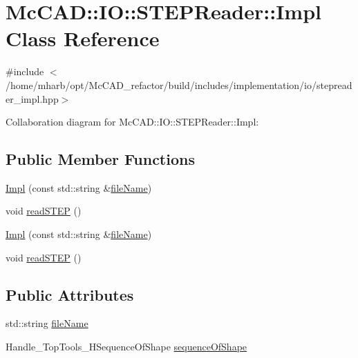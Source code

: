 \hypertarget{classMcCAD_1_1IO_1_1STEPReader_1_1Impl}{}\section{Mc\+C\+AD\+:\+:IO\+:\+:S\+T\+E\+P\+Reader\+:\+:Impl Class Reference}
\label{classMcCAD_1_1IO_1_1STEPReader_1_1Impl}


{\ttfamily \#include $<$/home/mharb/opt/\+Mc\+C\+A\+D\+\_\+refactor/build/includes/implementation/io/stepreader\+\_\+impl.\+hpp$>$}



Collaboration diagram for Mc\+C\+AD\+:\+:IO\+:\+:S\+T\+E\+P\+Reader\+:\+:Impl\+:
\subsection*{Public Member Functions}
\begin{DoxyCompactItemize}
\item 
\hyperlink{classMcCAD_1_1IO_1_1STEPReader_1_1Impl_a5be8cf4f0e40571ffdff4ecba69265ce}{Impl} (const std\+::string \&\hyperlink{classMcCAD_1_1IO_1_1STEPReader_1_1Impl_ad06c3157407f90e8a4b4524da0c9ceba}{file\+Name})
\item 
void \hyperlink{classMcCAD_1_1IO_1_1STEPReader_1_1Impl_adf3fe2fde0c4b949317c2e07b2fa57b9}{read\+S\+T\+EP} ()
\item 
\hyperlink{classMcCAD_1_1IO_1_1STEPReader_1_1Impl_a5be8cf4f0e40571ffdff4ecba69265ce}{Impl} (const std\+::string \&\hyperlink{classMcCAD_1_1IO_1_1STEPReader_1_1Impl_ad06c3157407f90e8a4b4524da0c9ceba}{file\+Name})
\item 
void \hyperlink{classMcCAD_1_1IO_1_1STEPReader_1_1Impl_adf3fe2fde0c4b949317c2e07b2fa57b9}{read\+S\+T\+EP} ()
\end{DoxyCompactItemize}
\subsection*{Public Attributes}
\begin{DoxyCompactItemize}
\item 
std\+::string \hyperlink{classMcCAD_1_1IO_1_1STEPReader_1_1Impl_ad06c3157407f90e8a4b4524da0c9ceba}{file\+Name}
\item 
Handle\+\_\+\+Top\+Tools\+\_\+\+H\+Sequence\+Of\+Shape \hyperlink{classMcCAD_1_1IO_1_1STEPReader_1_1Impl_a420bbc46a0f7740eca71ef5aa6ce5e55}{sequence\+Of\+Shape}
\end{DoxyCompactItemize}


